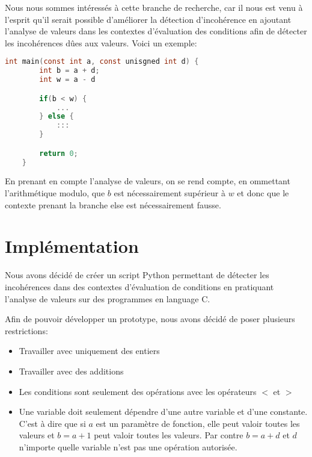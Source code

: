 Nous nous sommes intéressés à cette branche de recherche, car il nous est venu à l'esprit qu'il serait possible d'améliorer la détection d'incohérence en ajoutant l'analyse de valeurs dans les contextes d'évaluation des conditions afin de détecter les incohérences dûes aux valeurs. Voici un exemple:
\begin{lstlisting}[language=c, xleftmargin=.15\textwidth, caption={Exemple d'incohérence détectable par Value Analysis}, captionpos=b]
    int main(const int a, const unisgned int d) {
        int b = a + d;
        int w = a - d

        if(b < w) {
            ...
        } else {
            :::
        }

        return 0;
    }
\end{lstlisting}
En prenant en compte l'analyse de valeurs, on se rend compte, en ommettant l'arithmétique modulo, que $b$ est nécessairement supérieur à $w$ et donc que le contexte prenant la branche else est nécessairement fausse.

\section{Implémentation}
Nous avons décidé de créer un script Python permettant de détecter les incohérences dans des contextes d'évaluation de conditions en pratiquant l'analyse de valeurs sur des programmes en language C.

Afin de pouvoir développer un prototype, nous avons décidé de poser plusieurs restrictions:
\begin{itemize}
    \item Travailler avec uniquement des entiers
    \item Travailler avec des additions
    \item Les conditions sont seulement des opérations avec les opérateurs $<$ et $>$
    \item Une variable doit seulement dépendre d'une autre variable et d'une constante. C'est à dire que si $a$ est un paramètre de fonction, elle peut valoir toutes les valeurs et $b = a + 1$ peut valoir toutes les valeurs. Par contre $b = a + d$ et $d$ n'importe quelle variable n'est pas une opération autorisée.
\end{itemize}

